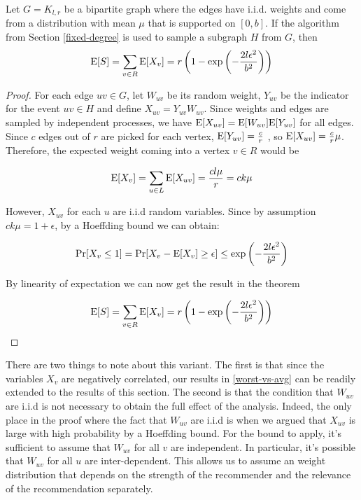 \begin{thm}
Let $G=K_{l,r}$ be a bipartite graph where the edges have i.i.d. weights and come from a distribution with mean $\mu$ that is supported on $[0,b]$. If the algorithm from Section \ref{fixed-degree} is used to sample a subgraph $H$ from $G$, then
\[ \text{E}[S] = \sum_{v\in R} \text{E}[X_v] = r\left(1-\exp\left(-\frac{2l\epsilon^2}{b^2}\right)\right) \]
\end{thm}

\begin{proof}
For each edge $uv\in G$, let $W_{uv}$ be its random weight, $Y_{uv}$ be
the indicator for the event $uv\in H$ and define $X_{uv} = Y_{uv}
W_{uv}$. Since weights and edges are sampled by independent processes,
we have $\text{E}[X_{uv}] = \text{E}[W_{uv}]\text{E}[Y_{uv}]$ for all edges. Since $c$
edges out of $r$ are picked for each vertex, $\text{E}[Y_{uv}] = \frac{c}{r}$
, so $\text{E}[X_{uv}] = \frac{c}{r}\mu$. Therefore, the expected weight
coming into a vertex $v\in R$ would be 

\[ \text{E}[X_v] = \sum_{u\in L} \text{E}[X_{uv}] = \frac{cl\mu}{r} = ck\mu\]

However, $X_{uv}$ for each $u$ are i.i.d random variables. Since by
assumption $ck\mu = 1+\epsilon$, by a Hoeffding bound we can obtain:

\[ \Pr[X_v \leq 1] = \Pr[X_v - \text{E}[X_v] \geq \epsilon] \leq \exp\left(-\frac{2l\epsilon^2}{b^2}\right) \]

By linearity of expectation we can now get the result in the theorem

\[ \text{E}[S] = \sum_{v\in R} \text{E}[X_v] = r\left(1-\exp\left(-\frac{2l\epsilon^2}{b^2}\right)\right) \]
\end{proof}

There are two things to note about this variant. The first is that
since the variables $X_v$ are negatively correlated, our results in
\ref{worst-vs-avg} can be readily extended to the results of this
section. The second is that the condition that $W_{uv}$ are i.i.d
is not necessary to obtain the full effect of the analysis. Indeed,
the only place in the proof where the fact that $W_{uv}$ are i.i.d
is when we argued that $X_{uv}$ is large with high probability by a
Hoeffding bound. For the bound to apply, it's sufficient to assume
that $W_{uv}$ for all $v$ are independent. In particular, it's 
possible that $W_{uv}$ for all $u$ are inter-dependent. This allows
us to assume an weight distribution that depends on the strength of 
the recommender and the relevance of the recommendation separately.
